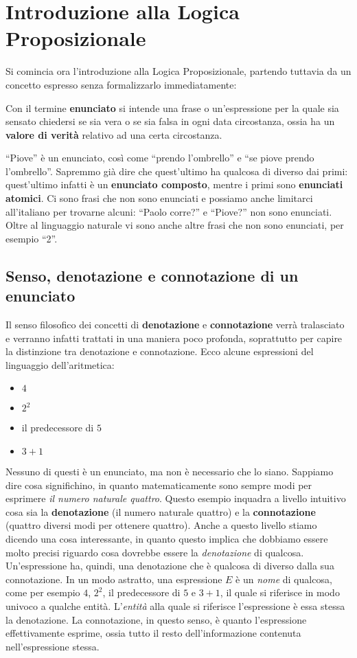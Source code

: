 \chapter{Introduzione alla Logica Proposizionale}
Si comincia ora l'introduzione alla Logica Proposizionale, 
partendo tuttavia da un concetto espresso senza formalizzarlo immediatamente: 
\begin{defi}[Enunciato]
Con il termine \textbf{enunciato} si intende una frase o un'espressione per la 
quale sia sensato chiedersi se sia vera o se sia falsa in ogni data 
circostanza, ossia ha un \textbf{valore di verità} relativo ad una 
certa circostanza. 
\end{defi}
``Piove'' è un enunciato, così come ``prendo l'ombrello'' 
e ``se piove prendo l'ombrello''. Sapremmo già dire che quest'ultimo ha 
qualcosa di diverso dai primi: quest'ultimo infatti è un \textbf{enunciato 
composto}, mentre i primi sono \textbf{enunciati atomici}. Ci sono frasi 
che non sono enunciati e possiamo anche limitarci all'italiano per trovarne 
alcuni: ``Paolo corre?'' e ``Piove?'' non sono enunciati. Oltre al linguaggio naturale 
vi sono anche altre frasi che non sono enunciati, per esempio ``2''. 

\section{Senso, denotazione e connotazione di un enunciato}
Il senso filosofico dei concetti di \textbf{denotazione} 
e \textbf{connotazione} verrà tralasciato e verranno infatti 
trattati in una maniera poco profonda, soprattutto per capire la distinzione
tra denotazione e connotazione. Ecco alcune espressioni del linguaggio 
dell'aritmetica: 
\begin{itemize}
  \setlength\itemsep{0pt}
  \item $4$
  \item $2^2$
  \item il predecessore di $5$ 
  \item $3+1$
\end{itemize}
Nessuno di questi è un enunciato, ma non è necessario che lo siano. 
Sappiamo dire cosa significhino, in quanto matematicamente sono sempre 
modi per esprimere \textit{il numero naturale quattro}. Questo esempio inquadra 
a livello intuitivo cosa sia la \textbf{denotazione} (il numero naturale 
quattro) e la \textbf{connotazione} (quattro diversi modi per ottenere quattro). 
Anche a questo livello stiamo dicendo una cosa interessante, in quanto 
questo implica che dobbiamo essere molto precisi riguardo cosa dovrebbe
essere la \textit{denotazione} di qualcosa. 
Un'espressione ha, quindi, una denotazione che è qualcosa di diverso dalla 
sua connotazione. In un modo astratto, una espressione $E$ è un \textit{nome}
di qualcosa, come per esempio $4$, $2^2$, il predecessore di $5$ e $3+1$, 
il quale si riferisce in modo univoco a qualche entità. L'\textit{entità} alla 
quale si riferisce l'espressione è 
essa stessa la denotazione. La connotazione, in questo senso, è quanto 
l'espressione effettivamente esprime, ossia tutto il resto dell'informazione 
contenuta nell'espressione stessa. 

